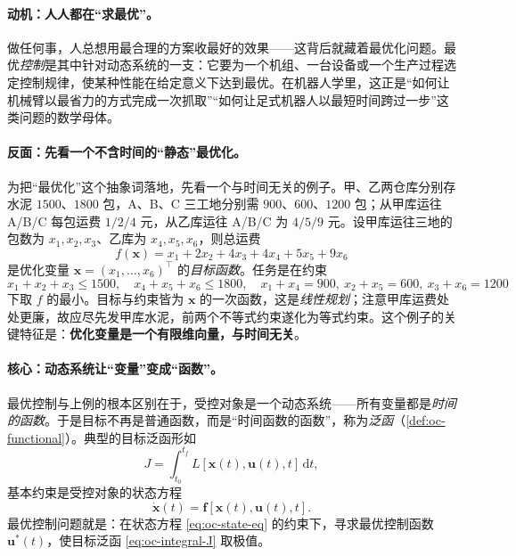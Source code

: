 \paragraph{动机：人人都在“求最优”。}
做任何事，人总想用最合理的方案收最好的效果——这背后就藏着最优化问题\cite{liubao2006modern}。最优\emph{控制}是其中针对动态系统的一支：它要为一个机组、一台设备或一个生产过程选定控制规律，使某种性能在给定意义下达到最优。在机器人学里，这正是“如何让机械臂以最省力的方式完成一次抓取”“如何让足式机器人以最短时间跨过一步”这类问题的数学母体。

\paragraph{反面：先看一个不含时间的“静态”最优化。}
为把“最优化”这个抽象词落地，先看一个与时间无关的例子\cite{liubao2006modern}。甲、乙两仓库分别存水泥 $1500$、$1800$ 包，A、B、C 三工地分别需 $900$、$600$、$1200$ 包；从甲库运往 A/B/C 每包运费 $1/2/4$ 元，从乙库运往 A/B/C 为 $4/5/9$ 元。设甲库运往三地的包数为 $x_1,x_2,x_3$、乙库为 $x_4,x_5,x_6$，则总运费
\begin{equation}
  f(\mathbf{x})=x_1+2x_2+4x_3+4x_4+5x_5+9x_6
  \label{eq:oc-lp-cost}
\end{equation}
是优化变量 $\mathbf{x}=(x_1,\dots,x_6)^\top$ 的\emph{目标函数}。任务是在约束
\begin{equation}
  x_1+x_2+x_3\le1500,\quad x_4+x_5+x_6\le1800,\quad x_1+x_4=900,\ x_2+x_5=600,\ x_3+x_6=1200
  \label{eq:oc-lp-constraints}
\end{equation}
下取 $f$ 的最小。目标与约束皆为 $\mathbf{x}$ 的一次函数，这是\emph{线性规划}；注意甲库运费处处更廉，故应尽先发甲库水泥，前两个不等式约束遂化为等式约束。这个例子的关键特征是：\textbf{优化变量是一个有限维向量，与时间无关}。

\paragraph{核心：动态系统让“变量”变成“函数”。}
最优控制与上例的根本区别在于，受控对象是一个动态系统——所有变量都是\emph{时间的函数}。于是目标不再是普通函数，而是“时间函数的函数”，称为\emph{泛函}（\cref{def:oc-functional}）。典型的目标泛函形如
\begin{equation}
  J=\int_{t_0}^{t_f}L[\mathbf{x}(t),\mathbf{u}(t),t]\,\mathrm dt,
  \label{eq:oc-integral-J}
\end{equation}
基本约束是受控对象的状态方程
\begin{equation}
  \dot{\mathbf{x}}(t)=\mathbf{f}[\mathbf{x}(t),\mathbf{u}(t),t].
  \label{eq:oc-state-eq}
\end{equation}
最优控制问题就是：在状态方程 \cref{eq:oc-state-eq} 的约束下，寻求最优控制函数 $\mathbf{u}^*(t)$，使目标泛函 \cref{eq:oc-integral-J} 取极值\cite{liubao2006modern,zhang2017modern}。

